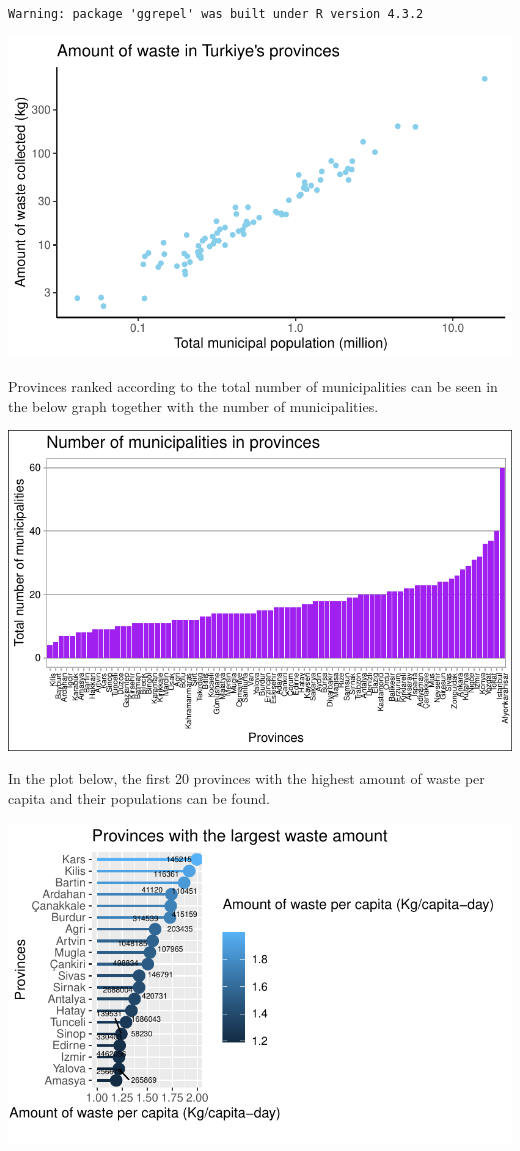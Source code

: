 \documentclass[
  11pt,
  a4paper,
  DIV=11,
  numbers=noendperiod]{scrartcl}
\begin{document}
\begin{verbatim}
Warning: package 'ggrepel' was built under R version 4.3.2
\end{verbatim}

\includegraphics{project_files/figure-pdf/unnamed-chunk-13-1.pdf}

Provinces ranked according to the total number of municipalities can be
seen in the below graph together with the number of municipalities.

\includegraphics{project_files/figure-pdf/unnamed-chunk-14-1.pdf}

In the plot below, the first 20 provinces with the highest amount of
waste per capita and their populations can be found.

\includegraphics{project_files/figure-pdf/unnamed-chunk-15-1.pdf}
\end{document}
